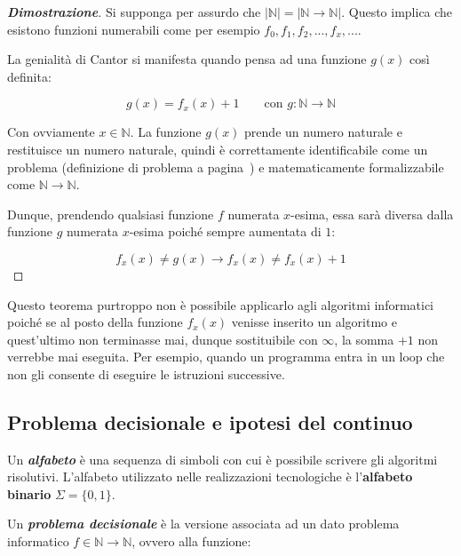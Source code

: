 \documentclass[a4paper]{article}
\begin{document}
	\begin{proof}[\textbf{Dimostrazione}]
		Si supponga per assurdo che $|\mathbb{N}| = |\mathbb{N}\longrightarrow\mathbb{N}|$. Questo implica che esistono funzioni numerabili come per esempio $f_0, f_1, f_2, ..., f_x, ...$.
		
		La genialità di Cantor si manifesta quando pensa ad una funzione $g(x)$ così definita:
	
		\begin{equation*}
			g(x) = f_{x}(x) + 1 \hspace{2em} \text{con } g:\mathbb{N}\longrightarrow\mathbb{N}
		\end{equation*}
	
		Con ovviamente $x\in\mathbb{N}$. La funzione $g(x)$ prende un numero naturale e restituisce un numero naturale, quindi è correttamente identificabile come un problema (definizione di problema a pagina~\pageref{def:problema}) e matematicamente formalizzabile come $\mathbb{N}\longrightarrow\mathbb{N}$.
		
		Dunque, prendendo qualsiasi funzione $f$ numerata $x$-esima, essa sarà diversa dalla funzione $g$ numerata $x$-esima poiché sempre aumentata di $1$:
		
		\begin{equation*}
			f_{x}(x) \ne g(x) \longrightarrow f_{x}(x) \ne f_{x}(x) + 1
		\end{equation*}
	\end{proof}

	Questo teorema purtroppo non è possibile applicarlo agli algoritmi informatici poiché se al posto della funzione $f_{x}(x)$ venisse inserito un algoritmo e quest'ultimo non terminasse mai, dunque sostituibile con $\infty$, la somma $+1$ non verrebbe mai eseguita. Per esempio, quando un programma entra in un loop che non gli consente di eseguire le istruzioni successive.
	
	\newpage
	
	
	
	\subsection{Problema decisionale e ipotesi del continuo}
	
	Un \textbf{\emph{alfabeto}} è una sequenza di simboli con cui è possibile scrivere gli algoritmi risolutivi. L'alfabeto utilizzato nelle realizzazioni tecnologiche è l'\textbf{alfabeto binario} $\Sigma = \{0, 1\}$.
	
	Un \textbf{\emph{problema decisionale}} è la versione associata ad un dato problema informatico $f\in\mathbb{N}\longrightarrow\mathbb{N}$, ovvero alla funzione:
	
\end{document}
